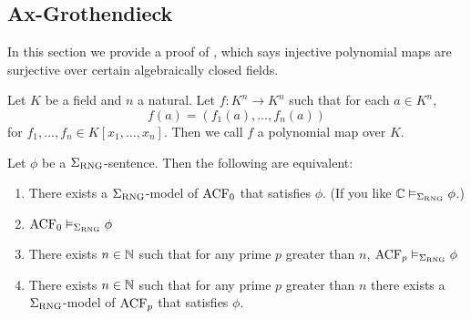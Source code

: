 \subsection{Ax-Grothendieck}
In this section we provide a proof of ,
which says injective polynomial maps are surjective over certain algebraically closed fields.

\begin{dfn}
  Let $K$ be a field and $n$ a natural.
  Let $f : K^n \to K^n$ such that for each $a \in K^n$,
  \[f(a) = (f_1(a), \dots, f_n(a))\] for
  $f_1, \dots, f_n \in K[x_1, \dots, x_n]$.
  Then we call $f$ a polynomial map over $K$.
\end{dfn}

\begin{prop}
    Let $\phi$ be a $\Sigma_{\mathrm{RNG}}$-sentence.
    Then the following are equivalent:
    \begin{enumerate}
        \item There exists a $\Sigma_{\mathrm{RNG}}$-model of $\operatorname{ACF}_0$ 
        that satisfies $\phi$.
        (If you like $\mathbb{C} \vDash_{\Sigma_{\mathrm{RNG}}} \phi$.)
        \item $\operatorname{ACF}_0 \vDash_{\Sigma_{\mathrm{RNG}}} \phi$
        \item There exists $n \in \mathbb{N}$ such that for any prime $p$
        greater than $n$,
        $\operatorname{ACF}_p \vDash_{\Sigma_{\mathrm{RNG}}} \phi$
        \item There exists $n \in \mathbb{N}$ such that for any prime $p$
        greater than $n$ there exists a $\Sigma_{\mathrm{RNG}}$-model
        of $\operatorname{ACF}_p$ that satisfies $\phi$.
    \end{enumerate}
\end{prop}
